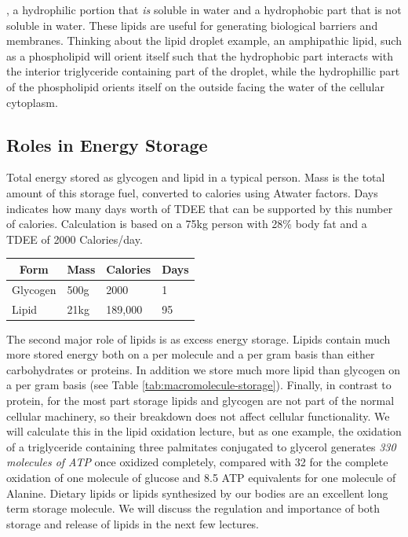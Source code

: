 \documentclass{tufte-handout}
\begin{document}
, a hydrophilic portion that \emph{is} soluble in water and a hydrophobic part that is not soluble in water.  These lipids are useful for generating biological barriers and membranes.  Thinking about the lipid droplet example, an amphipathic lipid, such as a phospholipid will orient itself such that the hydrophobic part interacts with the interior triglyceride containing part of the droplet, while the hydrophillic part of the phospholipid orients itself on the outside facing the water of the cellular cytoplasm.  

\subsection{Roles in Energy Storage}

\begin{margintable}
\centering
\caption{Total energy stored as glycogen and lipid in a typical person.  Mass is the total amount of this storage fuel, converted to calories using Atwater factors.  Days indicates how many days worth of TDEE that can be supported by this number of calories.  Calculation is based on a 75kg person with 28\% body fat and a TDEE of 2000 Calories/day.}
\label{tab:macromolecule-storage}
\begin{tabular}{llll}
\hline
\multicolumn{1}{c}{\textbf{Form}} & \textbf{Mass} & \textbf{Calories} & \textbf{Days} \\ \hline
Glycogen & 500g & 2000 & 1 \\
Lipid & 21kg & 189,000 & 95 \\
\end{tabular}
\end{margintable}

The second major role of lipids is as excess energy storage.  Lipids contain much more stored energy both on a per molecule and a per gram basis than either carbohydrates or proteins.  In addition we store much more lipid than glycogen on a per gram basis (see Table \ref{tab:macromolecule-storage}).  Finally, in contrast to protein, for the most part storage lipids and glycogen are not part of the normal cellular machinery, so their breakdown does not affect cellular functionality.  We will calculate this in the lipid oxidation lecture, but as one example, the oxidation of a triglyceride containing three palmitates conjugated to glycerol generates \emph{330 molecules of ATP} once oxidized completely, compared with 32 for the complete oxidation of one molecule of glucose and 8.5 ATP equivalents for one molecule of Alanine. Dietary lipids or lipids synthesized by our bodies are an excellent long term storage molecule.  We will discuss the regulation and importance of both storage and release of lipids in the next few lectures.
\end{document}
